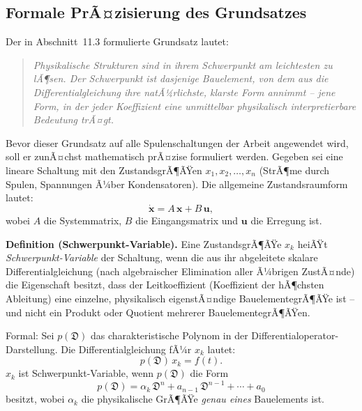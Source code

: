 ﻿\documentclass[12pt, a4paper]{article}
\begin{document}
	\subsection{Formale PrÃ¤zisierung des Grundsatzes}
	
	Der in Abschnitt~11.3 formulierte Grundsatz lautet:
	
	\begin{quote}
		\textit{Physikalische Strukturen sind in ihrem Schwerpunkt am leichtesten zu lÃ¶sen.
			Der Schwerpunkt ist dasjenige Bauelement, von dem aus die Differentialgleichung
			ihre natÃ¼rlichste, klarste Form annimmt -- jene Form, in der jeder Koeffizient
			eine unmittelbar physikalisch interpretierbare Bedeutung trÃ¤gt.}
	\end{quote}
	
	Bevor dieser Grundsatz auf alle Spulenschaltungen der Arbeit angewendet wird,
	soll er zunÃ¤chst mathematisch prÃ¤zise formuliert werden. Gegeben sei eine
	lineare Schaltung mit den ZustandsgrÃ¶ÃŸen $x_1, x_2, \ldots, x_n$ (StrÃ¶me
	durch Spulen, Spannungen Ã¼ber Kondensatoren). Die allgemeine Zustandsraum\-form
	lautet:
	\begin{equation}
		\dot{\mathbf{x}} = A\,\mathbf{x} + B\,\mathbf{u},
		\label{eq:zustandsraum}
	\end{equation}
	wobei $A$ die Systemmatrix, $B$ die Eingangsmatrix und $\mathbf{u}$ die
	Erregung ist.
	
	\textbf{Definition (Schwerpunkt-Variable).}
	Eine ZustandsgrÃ¶ÃŸe $x_k$ heiÃŸt \textit{Schwerpunkt-Variable} der Schaltung,
	wenn die aus ihr abgeleitete skalare Differentialgleichung (nach algebraischer
	Elimination aller Ã¼brigen ZustÃ¤nde) die Eigenschaft besitzt, dass der
	Leitkoeffizient (Koeffizient der hÃ¶chsten Ableitung) eine einzelne,
	physikalisch eigenstÃ¤ndige BauelementegrÃ¶ÃŸe ist -- und nicht ein Produkt oder
	Quotient mehrerer BauelementegrÃ¶ÃŸen.
	
	Formal: Sei $p(\mathfrak{D})$ das charakteristische Polynom in der
	Differentialoperator-Darstellung. Die Differentialgleichung fÃ¼r $x_k$ lautet:
	\begin{equation}
		p(\mathfrak{D})\,x_k = f(t).
	\end{equation}
	$x_k$ ist Schwerpunkt-Variable, wenn $p(\mathfrak{D})$ die Form
	\begin{equation}
		p(\mathfrak{D}) = \alpha_k\,\mathfrak{D}^n + a_{n-1}\,\mathfrak{D}^{n-1}
		+ \cdots + a_0
	\end{equation}
	besitzt, wobei $\alpha_k$ die physikalische GrÃ¶ÃŸe \emph{genau eines} Bauelements ist.
	
\end{document}
